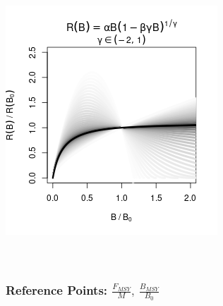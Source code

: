 \documentclass[a0paper,portrait]{baposter}
\begin{document}
\begin{poster}
{\begin{minipage}[h!]{0.55\textwidth}
\begin{minipage}[b]{0.48\textwidth}
		\includegraphics[width=\textwidth]{../../ddBias/g3Grey.png}
		$~$\\$~$\\$~$\\
	\end{minipage}
	
	\vspace*{-2cm}
	\subsubsection*{Reference Points: $\frac{F_{MSY}}{M}, ~\frac{B_{MSY}}{B_0}$}
	
	

\end{minipage}}
\end{poster}
\end{document}
